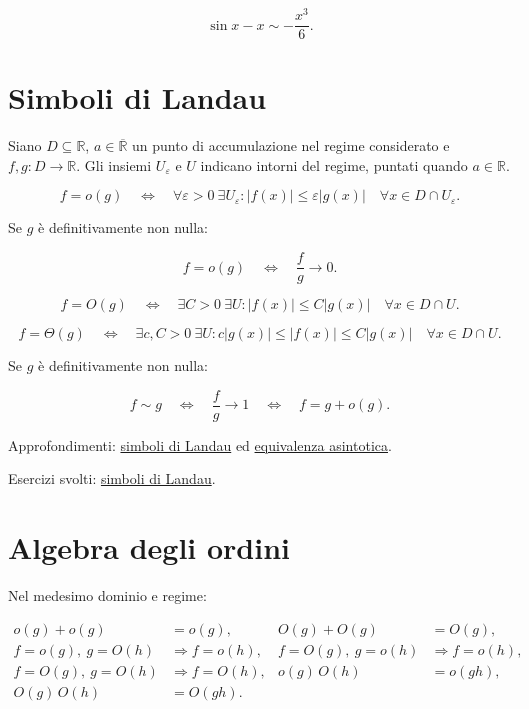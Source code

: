 \[
\sin x-x\sim-\frac{x^3}{6}.
\]

\section{Simboli di Landau}\label{simboli-di-landau}

Siano \(D\subseteq\mathbb R\), \(a\in\overline{\mathbb R}\) un punto di accumulazione nel regime considerato e \(f,g:D\to\mathbb R\). Gli insiemi \(U_\varepsilon\) e \(U\) indicano intorni del regime, puntati quando \(a\in\mathbb R\).

\[
\displaystyle
f=o(g)
\quad\Longleftrightarrow\quad
\forall\varepsilon>0\ \exists U_\varepsilon:
|f(x)|\le\varepsilon|g(x)|
\quad\forall x\in D\cap U_\varepsilon.
\]

Se \(g\) è definitivamente non nulla:

\[
\displaystyle
f=o(g)
\quad\Longleftrightarrow\quad
\frac{f}{g}\to0.
\]

\[
\displaystyle
f=O(g)
\quad\Longleftrightarrow\quad
\exists C>0\ \exists U:
|f(x)|\le C|g(x)|
\quad\forall x\in D\cap U.
\]

\[
\displaystyle
f=\Theta(g)
\quad\Longleftrightarrow\quad
\exists c,C>0\ \exists U:
c|g(x)|\le |f(x)|\le C|g(x)|
\quad\forall x\in D\cap U.
\]

Se \(g\) è definitivamente non nulla:

\[
\displaystyle
f\sim g
\quad\Longleftrightarrow\quad
\frac{f}{g}\to1
\quad\Longleftrightarrow\quad
f=g+o(g).
\]

Approfondimenti: \href{https://ingegnerismo.it/matematica/simboli-di-landau/}{simboli di Landau} ed \href{https://ingegnerismo.it/matematica/equivalenza-asintotica/}{equivalenza asintotica}.

Esercizi svolti: \href{https://ingegnerismo.it/matematica/simboli-di-landau-esercizi/}{simboli di Landau}.

\section{Algebra degli ordini}\label{algebra-degli-ordini}

Nel medesimo dominio e regime:

\[
\begin{aligned}
o(g)+o(g)&=o(g),&
O(g)+O(g)&=O(g),\\
f=o(g),\ g=O(h)&\Rightarrow f=o(h),&
f=O(g),\ g=o(h)&\Rightarrow f=o(h),\\
f=O(g),\ g=O(h)&\Rightarrow f=O(h),&
o(g)\,O(h)&=o(gh),\\
O(g)\,O(h)&=O(gh).&&
\end{aligned}
\]

